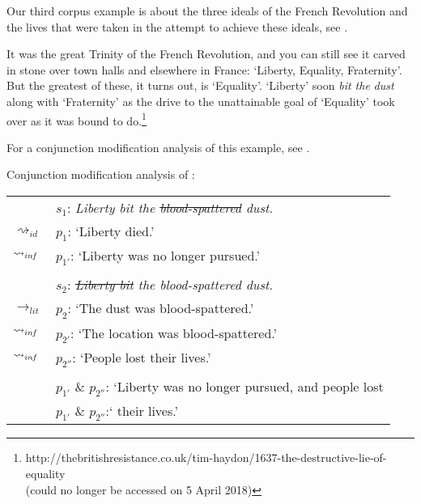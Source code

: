 \documentclass[output=paper]{langsci/langscibook}
\begin{document}
Our third corpus example is about the three ideals of the French Revolution and the lives that were taken in the attempt to achieve these ideals, see .

\ea \label{blood-spattered dust}
It was the great Trinity of the French Revolution, and you can still see it carved in stone over town halls and elsewhere in France: `Liberty, Equality, Fraternity'. But the greatest of these, it turns out, is `Equality'. `Liberty' soon \textit{bit the} \underline{} \textit{dust} along with `Fraternity' as the drive to the unattainable goal of `Equality' took over as it was bound to do.\footnote{http://thebritishresistance.co.uk/tim-haydon/1637-the-destructive-lie-of-equality \\
(could no longer be accessed on 5 April 2018)}
\z

\noindent For a conjunction modification analysis of this example, see . 

\ea \label{analysis blood-spattered dust} 
Conjunction modification analysis of : \\
\vspace{5pt}
\begin{tabular}{ll}
								& 	$s_{1}$: \hspace{4pt} \textit{Liberty bit the \sout{blood-spattered} dust.} \\
$\rightsquigarrow_{id}$				&	$p_{1}$: \hspace{1pt} `Liberty died.' \\
$\rightsquigarrow_{in\hspace{-0.8pt} f}$	&	$p_{1'}$: \hspace{-1.5pt} `Liberty was no longer pursued.' \\
\vspace{-5pt} \\
								& 	$s_{2}$: \hspace{4pt} \textit{\sout{Liberty bit} the blood-spattered dust.} \\
$\rightarrow_{lit}$					&	$p_{2}$: \hspace{1pt} `The dust was blood-spattered.' \\
$\rightsquigarrow_{in\hspace{-0.8pt} f}$	&	$p_{2'}$: \hspace{-1.5pt} `The location was blood-spattered.' \\
$\rightsquigarrow_{in\hspace{-0.8pt} f}$	&	$p_{2''}$: \hspace{-3pt} `People lost their lives.' \\
\vspace{-5pt} \\
								&	$p_{1'}$ \& $p_{2''}$: `Liberty was no longer pursued, and people lost \\
								&	{\white $p_{1'}$ \& $p_{2''}$:`} their lives.'
\end{tabular}
\z
\end{document}
